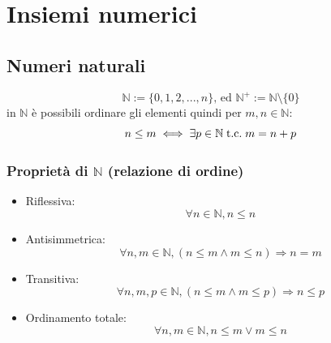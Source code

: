 \documentclass[a4paper, 12pt, openany]{book}
\begin{document}

	
	\chapter{Insiemi numerici}
	\section{Numeri naturali}
	\[\mathbb{N} := \{0, 1, 2, ..., n\} \text{, ed } \mathbb{N}^+ := \mathbb{N} \setminus \{0\} \]
	in $\mathbb{N}$ è possibili ordinare gli elementi quindi per $m,n \in \mathbb{N}$:
	\[n \leq m \iff \exists p \in \mathbb{N} \;\text{t.c.}\; m = n + p\]
	
	\subsection{Proprietà di $\mathbb{N}$ (relazione di ordine)}
	\begin{itemize}
		\item Riflessiva:
		\[\forall n \in \mathbb{N}, n \leq n\]
		\item Antisimmetrica:
		\[\forall n, m \in \mathbb{N}, (n \leq m \wedge m\leq n) \Rightarrow n = m\]
		\item Transitiva:
		\[\forall n, m, p \in \mathbb{N}, (n \leq m \wedge m \leq p) \Rightarrow n \leq p\]
		\item Ordinamento totale:
		\[\forall n, m \in \mathbb{N}, n\leq m \vee m \leq n\]
	\end{itemize}
	
\end{document}
